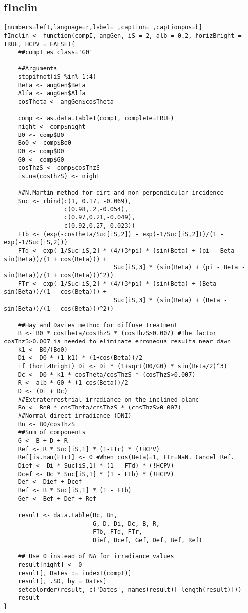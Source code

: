 \subsection{fInclin}
\label{sec:org39b4b4d}
\begin{lstlisting}[numbers=left,language=r,label= ,caption= ,captionpos=b]
fInclin <- function(compI, angGen, iS = 2, alb = 0.2, horizBright = TRUE, HCPV = FALSE){
    ##compI es class='G0'

    ##Arguments
    stopifnot(iS %in% 1:4)
    Beta <- angGen$Beta
    Alfa <- angGen$Alfa
    cosTheta <- angGen$cosTheta

    comp <- as.data.tableI(compI, complete=TRUE)
    night <- comp$night
    B0 <- comp$B0
    Bo0 <- comp$Bo0
    D0 <- comp$D0
    G0 <- comp$G0
    cosThzS <- comp$cosThzS
    is.na(cosThzS) <- night

    ##N.Martin method for dirt and non-perpendicular incidence
    Suc <- rbind(c(1, 0.17, -0.069),
                 c(0.98,.2,-0.054),
                 c(0.97,0.21,-0.049),
                 c(0.92,0.27,-0.023))
    FTb <- (exp(-cosTheta/Suc[iS,2]) - exp(-1/Suc[iS,2]))/(1 - exp(-1/Suc[iS,2]))
    FTd <- exp(-1/Suc[iS,2] * (4/(3*pi) * (sin(Beta) + (pi - Beta - sin(Beta))/(1 + cos(Beta))) +
                               Suc[iS,3] * (sin(Beta) + (pi - Beta - sin(Beta))/(1 + cos(Beta)))^2))
    FTr <- exp(-1/Suc[iS,2] * (4/(3*pi) * (sin(Beta) + (Beta - sin(Beta))/(1 - cos(Beta))) +
                               Suc[iS,3] * (sin(Beta) + (Beta - sin(Beta))/(1 - cos(Beta)))^2))

    ##Hay and Davies method for diffuse treatment
    B <- B0 * cosTheta/cosThzS * (cosThzS>0.007) #The factor cosThzS>0.007 is needed to eliminate erroneous results near dawn
    k1 <- B0/(Bo0)
    Di <- D0 * (1-k1) * (1+cos(Beta))/2
    if (horizBright) Di <- Di * (1+sqrt(B0/G0) * sin(Beta/2)^3)
    Dc <- D0 * k1 * cosTheta/cosThzS * (cosThzS>0.007)
    R <- alb * G0 * (1-cos(Beta))/2
    D <- (Di + Dc)
    ##Extraterrestrial irradiance on the inclined plane
    Bo <- Bo0 * cosTheta/cosThzS * (cosThzS>0.007) 
    ##Normal direct irradiance (DNI)
    Bn <- B0/cosThzS
    ##Sum of components
    G <- B + D + R
    Ref <- R * Suc[iS,1] * (1-FTr) * (!HCPV)
    Ref[is.nan(FTr)] <- 0 #When cos(Beta)=1, FTr=NaN. Cancel Ref.
    Dief <- Di * Suc[iS,1] * (1 - FTd) * (!HCPV)
    Dcef <- Dc * Suc[iS,1] * (1 - FTb) * (!HCPV)
    Def <- Dief + Dcef
    Bef <- B * Suc[iS,1] * (1 - FTb)
    Gef <- Bef + Def + Ref

    result <- data.table(Bo, Bn,
                         G, D, Di, Dc, B, R,
                         FTb, FTd, FTr,
                         Dief, Dcef, Gef, Def, Bef, Ref) 

    ## Use 0 instead of NA for irradiance values
    result[night] <- 0
    result[, Dates := indexI(compI)]
    result[, .SD, by = Dates]
    setcolorder(result, c('Dates', names(result)[-length(result)]))
    result
}
\end{lstlisting}
